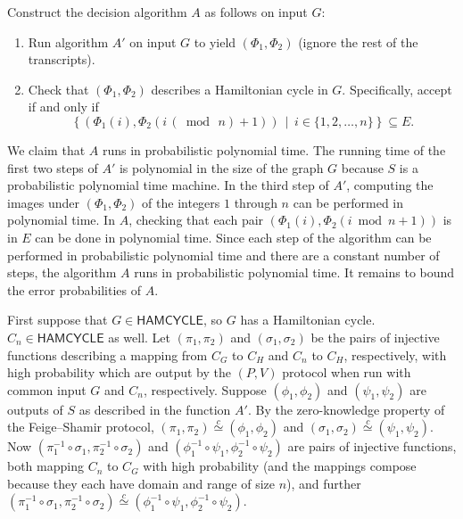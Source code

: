 \documentclass[draft]{article}
\newcommand{\lang}[1]{{\ensuremath{\mathsf{#1}}}}
\newcommand{\cid}{\overset{c}{\simeq}}
\renewcommand{\pmod}[1]{\,(\bmod{\,#1})}
\begin{document}
\begin{enumerate}
  Construct the decision algorithm $A$ as follows on input $G$:
  \begin{enumerate}
  \item Run algorithm $A'$ on input $G$ to yield $(\Phi_1, \Phi_2)$ (ignore the rest of the transcripts).
  \item 
    Check that $(\Phi_1, \Phi_2)$ describes a Hamiltonian cycle in $G$.
    Specifically, accept if and only if
    \begin{displaymath}
      \left\{(\Phi_1(i), \Phi_2(i \pmod{n} + 1)) \,\middle|\, i \in \{1, 2, \ldots, n\}\right\}\subseteq E.
    \end{displaymath}
  \end{enumerate}

  We claim that $A$ runs in probabilistic polynomial time.
  The running time of the first two steps of $A'$ is polynomial in the size of the graph $G$ because $S$ is a probabilistic polynomial time machine.
  In the third step of $A'$, computing the images under $(\Phi_1, \Phi_2)$ of the integers $1$ through $n$ can be performed in polynomial time.
  In $A$, checking that each pair $(\Phi_1(i), \Phi_2(i \bmod{n} + 1))$ is in $E$ can be done in polynomial time.
  Since each step of the algorithm can be performed in probabilistic polynomial time and there are a constant number of steps, the algorithm $A$ runs in probabilistic polynomial time.
  It remains to bound the error probabilities of $A$.

  First suppose that $G\in\lang{HAMCYCLE}$, so $G$ has a Hamiltonian cycle.
  $C_n\in\lang{HAMCYCLE}$ as well.
  Let $(\pi_1, \pi_2)$ and $(\sigma_1, \sigma_2)$ be the pairs of injective functions describing a mapping from $C_G$ to $C_H$ and $C_n$ to $C_H$, respectively, with high probability which are output by the $(P, V)$ protocol when run with common input $G$ and $C_n$, respectively.
  Suppose $(\phi_1, \phi_2)$ and $(\psi_1, \psi_2)$ are outputs of $S$ as described in the function $A'$.
  By the zero-knowledge property of the Feige--Shamir protocol, $(\pi_1, \pi_2)\cid (\phi_1, \phi_2)$ and $(\sigma_1, \sigma_2)\cid(\psi_1, \psi_2)$.
  Now $(\pi_1^{-1}\circ\sigma_1, \pi_2^{-1}\circ\sigma_2)$ and $(\phi_1^{-1}\circ\psi_1, \phi_2^{-1}\circ\psi_2)$ are pairs of injective functions, both mapping $C_n$ to $C_G$ with high probability (and the mappings compose because they each have domain and range of size $n$), and further $(\pi_1^{-1}\circ\sigma_1, \pi_2^{-1}\circ\sigma_2) \cid (\phi_1^{-1}\circ\psi_1, \phi_2^{-1}\circ\psi_2)$.


\end{enumerate}
\end{document}

